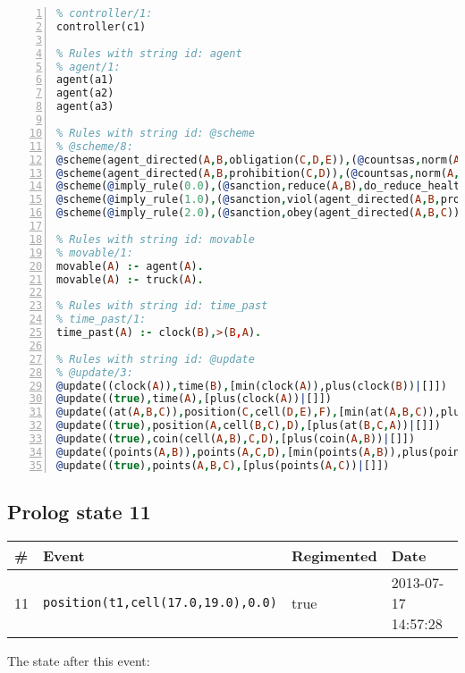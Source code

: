 \documentclass[11pt]{article}\usepackage[utf8]{inputenc}\usepackage{geometry}
\begin{document}
\begin{lstlisting}[language=Prolog, numbers=left]
% Rules with string id: controller
% controller/1:
controller(c1)

% Rules with string id: agent
% agent/1:
agent(a1)
agent(a2)
agent(a3)

% Rules with string id: @scheme
% @scheme/8:
@scheme(agent_directed(A,B,obligation(C,D,E)),(@countsas,norm(A,B,F,obligation(C,D,E)),F),false,(listTrue(C)),(time_past(D)),false,[plus(viol(agent_directed(A,B,obligation(C,D,E))))|[]],[plus(obey(agent_directed(A,B,obligation(C,D,E))))|[]])
@scheme(agent_directed(A,B,prohibition(C,D)),(@countsas,norm(A,B,E,prohibition(C,D)),E),(listTrue(C)),false,(false),false,[plus(viol(agent_directed(A,B,prohibition(C,D))))|[]],[plus(obey(agent_directed(A,B,prohibition(C,D))))|[]])
@scheme(@imply_rule(0.0),(@sanction,reduce(A,B),do_reduce_health(A,B),notifyAgent(A,changed(status))),true,false,false,false,[min(reduce(A,B))|[]],[])
@scheme(@imply_rule(1.0),(@sanction,viol(agent_directed(A,B,prohibition(C,D))),do_sanction(D)),true,false,false,false,[min(viol(agent_directed(A,B,prohibition(C,D))))|[]],[])
@scheme(@imply_rule(2.0),(@sanction,obey(agent_directed(A,B,C))),true,false,false,false,[min(obey(agent_directed(A,B,C)))|[]],[])

% Rules with string id: movable
% movable/1:
movable(A) :- agent(A).
movable(A) :- truck(A).

% Rules with string id: time_past
% time_past/1:
time_past(A) :- clock(B),>(B,A).

% Rules with string id: @update
% @update/3:
@update((clock(A)),time(B),[min(clock(A)),plus(clock(B))|[]])
@update((true),time(A),[plus(clock(A))|[]])
@update((at(A,B,C)),position(C,cell(D,E),F),[min(at(A,B,C)),plus(at(D,E,C))|[]])
@update((true),position(A,cell(B,C),D),[plus(at(B,C,A))|[]])
@update((true),coin(cell(A,B),C,D),[plus(coin(A,B))|[]])
@update((points(A,B)),points(A,C,D),[min(points(A,B)),plus(points(A,D))|[]])
@update((true),points(A,B,C),[plus(points(A,C))|[]])

\end{lstlisting}
\clearpage 
\subsection{Prolog state 11}
\begin{table}[ht]
\centering 
\begin{tabular}{l l l l} 
\textbf{\#} & \textbf{Event} & \textbf{Regimented} & \textbf{Date} \\ [0.5ex] 
\hline
11&\texttt{position(t1,cell(17.0,19.0),0.0)}&true&2013-07-17 14:57:28\\ [1ex] \hline\end{tabular}
\end{table}
The state after this event:
\end{document}
